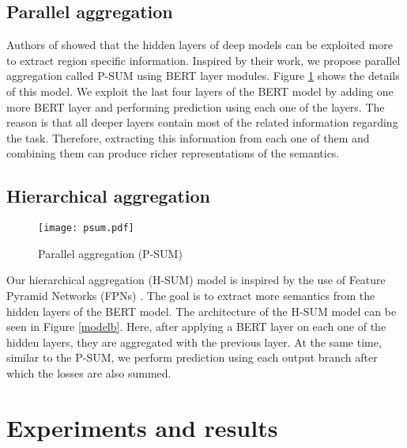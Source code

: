 \documentclass{article}
\begin{document}
\subsection{Parallel aggregation}
Authors of \cite{rossi2020novel} showed that the hidden layers of deep models can be exploited more to extract region specific information. Inspired by their work, we propose parallel aggregation called P-SUM using BERT layer modules. Figure \ref{modela} shows the details of this model. We exploit the last four layers of the BERT model by adding one more BERT layer and performing prediction using each one of the layers. The reason is that all deeper layers contain most of the related information regarding the task. Therefore, extracting this information from each one of them and combining them can produce richer representations of the semantics. 

\subsection{Hierarchical aggregation}

\begin{figure}
	\begin{center}
		\texttt{[image: psum.pdf]}
		\caption{Parallel aggregation (P-SUM)}
		\label{modela}
	\end{center}
\end{figure}

Our hierarchical aggregation (H-SUM) model is inspired by the use of Feature Pyramid Networks (FPNs) \cite{lin2017feature}. The goal is to extract more semantics from the hidden layers of the BERT model. The architecture of the H-SUM model can be seen in Figure \ref{modelb}. Here, after applying a BERT layer on each one of the hidden layers, they are aggregated with the previous layer. At the same time, similar to the P-SUM, we perform prediction using each output branch after which the losses are also summed. 

\section{Experiments and results}
\end{document}

